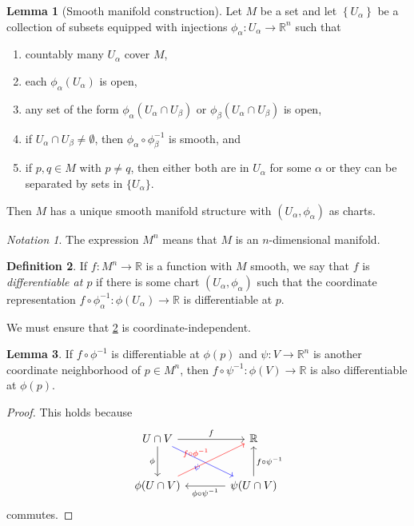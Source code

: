 \documentclass[10pt,letterpaper,cm]{nupset}
\theoremstyle{definition}
\newtheorem{definition}{Definition}[subsection]
\theoremstyle{theorem}
\newtheorem{lemma}[definition]{Lemma}
\theoremstyle{remark}
\newtheorem*{notation}{Notation}
\newcommand{\R}{\mathbb R}
\newcommand{\1}{\mathbf{1}}
\newcommand{\0}{\vec 0}
\begin{document}
\begin{lemma}[Smooth manifold construction]\label{smc}
Let $M$ be a set and let $\left\{U_\alpha\right\}$ be a collection of subsets equipped with injections $\phi_\alpha : U_\alpha \to \R^n$ such that
\begin{enumerate}[label=(\roman*)]
\item countably many $U_\alpha$ cover $M$,
\item each $\phi_\alpha(U_\alpha)$ is open,
\item any set of the form $\phi_\alpha(U_\alpha \cap U_\beta)$ or $\phi_\beta(U_\alpha \cap U_\beta)$ is open,
\item if $U_\alpha \cap U_\beta \ne \emptyset$, then $\phi_\alpha \circ \phi_\beta^{-1}$ is smooth, 
and
\item if $p, q\in M$ with $p\ne q$, then either both are in $U_\alpha$ for some $\alpha$ or they can be separated by sets in $\{U_\alpha\}$.
\end{enumerate}

Then $M$ has a unique smooth manifold structure with $\left(U_\alpha, \phi_\alpha\right)$ as charts. 
\end{lemma}

\smallskip

\begin{notation}
The expression $M^n$ means that $M$ is an $n$-dimensional manifold.
\end{notation}

\begin{definition}\label{d1}
If $f: M^n \to \R$ is a function with $M$ smooth, we say that $f$ is \textit{differentiable at $p$} if there is some chart $\left(U_\alpha, \phi_\alpha\right)$ such that the coordinate representation $f\circ \phi_\alpha^{-1}: \phi(U_\alpha) \to \R$ is differentiable at $p$.
\end{definition}

We must ensure that \cref{d1} is coordinate-independent. 

\begin{lemma}
If $f \circ \phi^{-1}$ is differentiable at $\phi(p)$ and $\psi: V \to \R^n$ is another coordinate neighborhood of $p\in M^n$, then $f \circ \psi^{-1}: \phi(V) \to \R$ is also differentiable at $\phi(p)$.
\end{lemma}
\begin{proof}
This holds because
\[ \begin{tikzcd}[row sep=large, column sep=large]
U \cap V \arrow[to=Z, "\phi", swap] \arrow[to=2-2, dr, blue, "\psi", swap]
& \R \\
|[alias=Z]| \phi(U \cap V) \arrow[to=1-2, ur, red, "f\circ \phi^{-1}"] 
& \psi(U \cap V)
\arrow[from=ul, to=1-2, "f"] \arrow[to=Z, "\phi \circ \psi^{-1}"] \arrow[to=1-2, "f \circ \psi^{-1}", swap] 
\end{tikzcd}
\]
commutes.
\end{proof}
\end{document}
